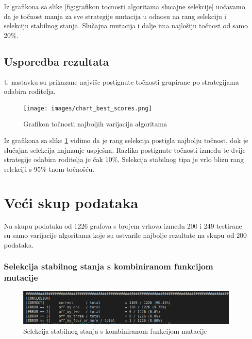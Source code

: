 \documentclass[times, utf8, zavrsni, numeric]{fer}
\begin{document}
Iz grafikona sa slike \ref{fig:grafikon tocnosti algoritama slucajne selekcije} uočavamo da je točnost manja za sve strategije mutacija u odnosu na rang selekciju i selekciju stabilnog stanja. Slučajna mutacija i dalje ima najlošiju točnost od samo 20\%.

\newpage
\subsection{Usporedba rezultata}
U nastavku su prikazane najviše postignute točnosti grupirane po strategijama odabira roditelja.

\begin{figure}[h]
\centering
\texttt{[image: images/chart\_best\_scores.png]}
\caption{Grafikon točnosti najboljih varijacija algoritama}
\label{fig:grafikon tocnosti najboljih varijacija algoritama}
\end{figure}

Iz grafikona sa slike \ref{fig:grafikon tocnosti najboljih varijacija algoritama} vidimo da je rang selekcija postigla najbolju točnost, dok je slučajna selekcija najmanje uspješna. Razlika postignute točnosti između te dvije strategije odabira roditelja je čak 10\%. Selekcija stabilnog tipa je vrlo blizu rang selekciji s 95\%-tnom točnošću. 

\newpage
\section{Veći skup podataka}
Na skupu podataka od 1226 grafova s brojem vrhova između 200 i 249 testirane su samo varijacije algoritama koje su ostvarile najbolje rezultate na skupu od 200 podataka.

\subsubsection{Selekcija stabilnog stanja s kombiniranom funkcijom mutacije}

\begin{figure}[h]
\centering
\includegraphics[width=14cm]{images/custom_mutacija_200_249.png}
\caption{Selekcija stabilnog stanja s kombiniranom funkcijom mutacije}
\label{fig:sss kombinirana rezultati}
\end{figure}
\end{document}
